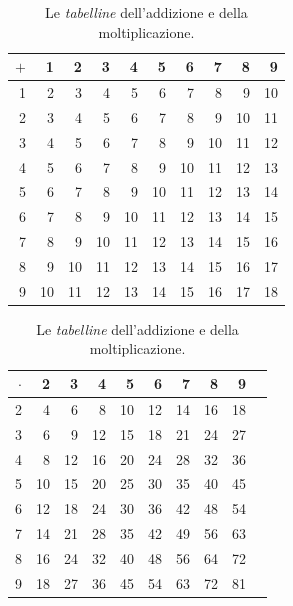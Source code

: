 \begin{table}
  \begin{center}
    \setlength{\tabcolsep}{3pt}
    \begin{tabular}{>{\small}r|>{\small}r>{\small}r>{\small}r>{\small}r>{\small}r>{\small}r>{\small}r>{\small}r>{\small}r}
      $+$       & 1 & 2 & 3 & 4 & 5 & 6 & 7 & 8 & 9 \\ \hline
      1         & 2 & 3 & 4 & 5 & 6 & 7 & 8 & 9 & 10 \\
      2         & 3 & 4 & 5 & 6 & 7 & 8 & 9 & 10 & 11 \\
      3         & 4 & 5 & 6 & 7 & 8 & 9 & 10 & 11 & 12 \\
      4         & 5 & 6 & 7 & 8 & 9 & 10 & 11 & 12 & 13 \\
      5         & 6 & 7 & 8 & 9 & 10 & 11 & 12 & 13 & 14 \\
      6         & 7 & 8 & 9 & 10 & 11 & 12 & 13 & 14 & 15 \\
      7         & 8 & 9 & 10 & 11 & 12 & 13 & 14 & 15 & 16 \\
      8         & 9 & 10 & 11 & 12 & 13 & 14 & 15 & 16 & 17 \\
      9         & 10 & 11 & 12 & 13 & 14 & 15 & 16 & 17 & 18
      \end{tabular}
      \qquad
      \begin{tabular}{>{\small}r|r>{\small}r>{\small}r>{\small}r>{\small}r>{\small}r>{\small}r>{\small}r>{\small}r}
        $\cdot$       & 2 & 3 & 4 & 5 & 6 & 7 & 8 & 9 \\ \hline
        2         & 4 & 6 & 8 & 10 & 12 & 14 & 16 & 18 \\
        3         & 6 & 9 & 12 & 15 & 18 & 21 & 24 & 27 \\
        4         & 8 & 12 & 16 & 20 & 24 & 28 & 32 & 36 \\
        5         & 10 & 15 & 20 & 25 & 30 & 35 & 40 & 45 \\
        6         & 12 & 18 & 24 & 30 & 36 & 42 & 48 & 54 \\
        7         & 14 & 21 & 28 & 35 & 42 & 49 & 56 & 63 \\
        8         & 16 & 24 & 32 & 40 & 48 & 56 & 64 & 72 \\
        9         & 18 & 27 & 36 & 45 & 54 & 63 & 72 & 81
      \end{tabular}
    \end{center}
    \caption{Le \emph{tabelline} dell'addizione e della moltiplicazione.}
    \label{tab:tabelline}
\end{table}

